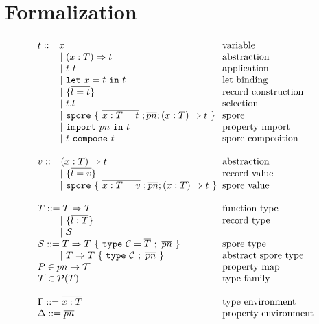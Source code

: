 \documentclass{llncs}
\newcommand{\seq}[1]{\overline{#1}}
\newcommand{\ba}{\begin{array}}
\newcommand{\ea}{\end{array}}
\newcommand{\gap}{\quad\quad}
\begin{document}
\section{Formalization}


\label{sec:formal}

\begin{figure}[ht!]
  \centering

  $\ba[t]{l@{\hspace{2mm}}l}
t ::=     x                                 & \mbox{variable}
\\
\gap ~|~  (x: T) \Rightarrow t              & \mbox{abstraction}
\\
\gap ~|~  t~t                               & \mbox{application}
\\
\gap ~|~  \texttt{let}~x = t~\texttt{in}~t  & \mbox{let binding}
\\
\gap ~|~  \{ \seq{l = t} \}                 & \mbox{record construction}
\\
\gap ~|~  t.l                               & \mbox{selection}
\\
\gap ~|~  \texttt{spore}~\{~\seq{x : T = t}~; \seq{pn} ; (x: T) \Rightarrow t~\}  & \mbox{spore}
\\
\gap ~|~  \texttt{import}~pn~\texttt{in}~t  & \mbox{property import}
\\
\gap ~|~  t~\texttt{compose}~t              & \mbox{spore composition}
\\
 & \\
v ::=     (x: T) \Rightarrow t              & \mbox{abstraction}
\\
\gap ~|~  \{ \seq{l = v} \}                 & \mbox{record value}
\\
\gap ~|~  \texttt{spore}~\{~\seq{x : T = v}~; \seq{pn} ; (x: T) \Rightarrow t~\}  & \mbox{spore value}
\\
 & \\
T ::=     T \Rightarrow T                   & \mbox{function type} \\
\gap ~|~  \{ \seq{l : T} \}                 & \mbox{record type}   \\
\gap ~|~  \mathcal{S}                       & \mbox{}
\\
\mathcal{S} ::= T \Rightarrow T~\{~\texttt{type}~\mathcal{C} = \seq{T}~;~\seq{pn}~\}   & \mbox{spore type}
\\
\gap ~|~  T \Rightarrow T~\{~\texttt{type}~\mathcal{C}~;~\seq{pn}~\}   & \mbox{abstract spore type}
\\
P \in pn \rightarrow \mathcal{T} & \mbox {property map}
\\
\mathcal{T} \in \mathcal{P}(T)   & \mbox{type family}
\\
 & \\
\Gamma ::=  \seq{x : T}          & \mbox{type environment}
\\
\Delta ::=  \seq{pn}             & \mbox{property environment}
\\
\ea$


\end{figure}
\end{document}
